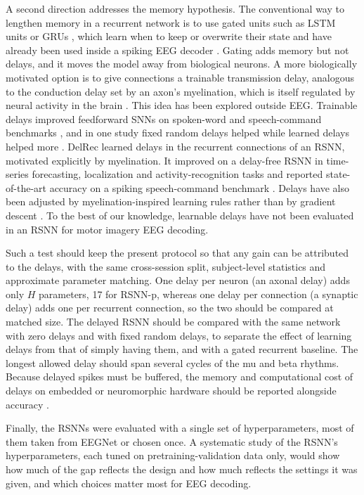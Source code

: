 \documentclass[conference]{IEEEtran}
\begin{document}
A second direction addresses the memory hypothesis. The conventional way to lengthen memory in a recurrent network is to use gated units such as LSTM units or GRUs \cite{hochreiter1997,cho2014}, which learn when to keep or overwrite their state and have already been used inside a spiking EEG decoder \cite{gong2023}. Gating adds memory but not delays, and it moves the model away from biological neurons. A more biologically motivated option is to give connections a trainable transmission delay, analogous to the conduction delay set by an axon's myelination, which is itself regulated by neural activity in the brain \cite{fields2015}. This idea has been explored outside EEG. Trainable delays improved feedforward SNNs on spoken-word and speech-command benchmarks \cite{sun2023,hammouamri2024}, and in one study fixed random delays helped while learned delays helped more \cite{hammouamri2024}. DelRec learned delays in the recurrent connections of an RSNN, motivated explicitly by myelination. It improved on a delay-free RSNN in time-series forecasting, localization and activity-recognition tasks and reported state-of-the-art accuracy on a spiking speech-command benchmark \cite{queant2025}. Delays have also been adjusted by myelination-inspired learning rules rather than by gradient descent \cite{hazan2022,nadafian2024}. To the best of our knowledge, learnable delays have not been evaluated in an RSNN for motor imagery EEG decoding.

Such a test should keep the present protocol so that any gain can be attributed to the delays, with the same cross-session split, subject-level statistics and approximate parameter matching. One delay per neuron (an axonal delay) adds only $H$ parameters, 17 for RSNN-p, whereas one delay per connection (a synaptic delay) adds one per recurrent connection, so the two should be compared at matched size. The delayed RSNN should be compared with the same network with zero delays and with fixed random delays, to separate the effect of learning delays from that of simply having them, and with a gated recurrent baseline. The longest allowed delay should span several cycles of the mu and beta rhythms. Because delayed spikes must be buffered, the memory and computational cost of delays on embedded or neuromorphic hardware should be reported alongside accuracy \cite{patinosaucedo2023}.

Finally, the RSNNs were evaluated with a single set of hyperparameters, most of them taken from EEGNet or chosen once. A systematic study of the RSNN's hyperparameters, each tuned on pretraining-validation data only, would show how much of the gap reflects the design and how much reflects the settings it was given, and which choices matter most for EEG decoding.
\end{document}
